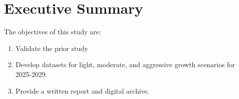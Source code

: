 \chapter*{Executive Summary}
\label{chap:executive_summary}

The objectives of this study are:

\begin{enumerate}
    \item Validate the prior study
    \item Develop datasets for light, moderate, and aggressive growth scenarios for 2025-2029.
    \item Provide a written report and digital archive.
\end{enumerate}